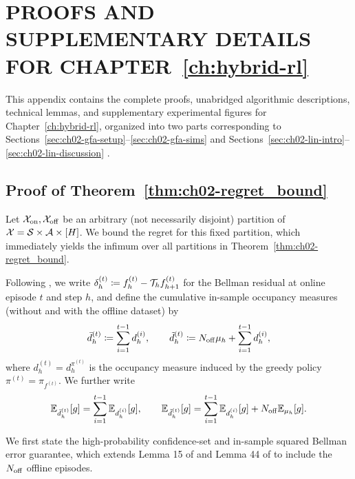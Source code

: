 \chapter{PROOFS AND SUPPLEMENTARY DETAILS FOR CHAPTER~\ref{ch:hybrid-rl}}
\label{app:ch02}

This appendix contains the complete proofs, unabridged algorithmic descriptions, technical lemmas, and supplementary experimental figures for Chapter~\ref{ch:hybrid-rl}, organized into two parts corresponding to Sections~\ref{sec:ch02-gfa-setup}--\ref{sec:ch02-gfa-sims} \citep{tan2024natural} and Sections~\ref{sec:ch02-lin-intro}--\ref{sec:ch02-lin-discussion} \citep{tan2024hybrid}.


\section{Proof of Theorem~\ref{thm:ch02-regret_bound}}
\label{app:ch02-proof_thm1}

Let ${\mathcal{X}}_{{\operatorname{on}}}, {\mathcal{X}}_{{\operatorname{off}}}$ be an arbitrary (not necessarily disjoint) partition of ${\mathcal{X}} = {\mathcal{S}} \times {\mathcal{A}} \times [H]$. We bound the regret for this fixed partition, which immediately yields the infimum over all partitions in Theorem~\ref{thm:ch02-regret_bound}.

Following \citet{xie2022role}, we write $\delta_h^{(t)} \coloneqq f_h^{(t)} - {\mathcal{T}}_h f_{h+1}^{(t)}$ for the Bellman residual at online episode $t$ and step $h$, and define the cumulative in-sample occupancy measures (without and with the offline dataset) by
\begin{equation}
    \bar{d}_h^{(t)} \coloneqq \sum_{i = 1}^{t-1} d^{(i)}_h, \qquad \tilde{d}_h^{(t)} \coloneqq  N_{{\operatorname{off}}} \mu_{h} +  \sum_{i = 1}^{t-1} d_h^{(i)},
\end{equation}
where $d^{(t)}_h = d^{\pi^{(t)}}_h$ is the occupancy measure induced by the greedy policy $\pi^{(t)} = \pi_{f^{(t)}}$. We further write
\begin{equation}
    \mathbb{E}_{\bar d_h^{(t)}}[g] = \sum_{i = 1}^{t-1} \mathbb{E}_{d_h^{(i)}}[g], \qquad \mathbb{E}_{\tilde{ d}_h^{(t)}}[g] = \sum_{i = 1}^{t-1} \mathbb{E}_{d_h^{(i)}}[g] + N_{{\operatorname{off}}} \mathbb{E}_{\mu_{h}}[g].
\end{equation}

We first state the high-probability confidence-set and in-sample squared Bellman error guarantee, which extends Lemma 15 of \citet{xie2022role} and Lemma 44 of \citet{jin2021bellmaneluder} to include the $N_{{\operatorname{off}}}$ offline episodes.

